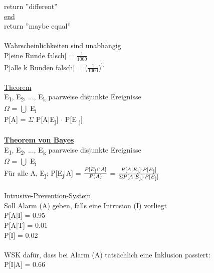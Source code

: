 \documentclass{article}
\begin{document}
 return ''different'' \\
 \underline{end} \\
 return ''maybe equal'' \\
 \\
 Wahrscheinlichkeiten sind unabh\"angig \\
 P[eine Runde falsch] = $\frac{1}{1000}$ \\
 P[alle k Runden falsch] = ($\frac{1}{1000}$)\textsuperscript{k} \\
 \\
 \underline{Theorem} \\
 E\textsubscript{1}, E\textsubscript{2}, ..., E\textsubscript{k} paarweise disjunkte Ereignisse \\
 $\Omega$ = $\bigcup$ E\textsubscript{i} \\
 P[A] = $\Sigma$ P[A$\mid$E\textsubscript{j}] $\cdot$ P[E			\textsubscript{j}] \\
 \\
 \textbf{\underline{Theorem von Bayes}} \\
 E\textsubscript{1}, E\textsubscript{2}, ..., E\textsubscript{k} paarweise disjunkte Ereignisse \\
 $\Omega$ = $\bigcup$ E\textsubscript{i} \\
 F\"ur alle A, E\textsubscript{j}: P[E\textsubscript{j}$\mid$A] = $		\frac{P[E\textsubscript{j} \cap A]}{P(A)}$ = $\frac{P[A \mid E			\textsubscript{j}] \cdot P[E\textsubscript{j}]}{\Sigma P[A \mid E		\textsubscript{j}] \cdot P[E\textsubscript{j}]}$ \\
 \\
 \underline{Intrusive-Prevention-System} \\
 Soll Alarm (A) geben, falls eine Intrusion (I) vorliegt \\
 P[A$\mid$I] = 0.95 \\
 P[A$\mid$T] = 0.01 \\
 P[I] = 0.02 \\
 \\
 WSK daf\"ur, dass bei Alarm (A) tats\"achlich eine Inklusion passiert: \\
 P[I$\mid$A] = 0.66 \\
 
 	
 
\end{document}
